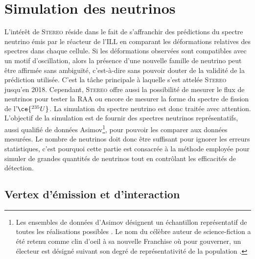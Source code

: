 
\section{Simulation des neutrinos}
\label{sec:neutrino_simulation}

L'intérêt de \textsc{Stereo} réside dans le fait de s'affranchir des prédictions du spectre neutrino émis par le réacteur de l'ILL en comparant les déformations relatives des spectres dans chaque cellule. Si les déformations observées sont compatibles avec un motif d'oscillation, alors la présence d'une nouvelle famille de neutrino peut être affirmée sans ambiguïté, c'est-à-dire sans pouvoir douter de la validité de la prédiction utilisée. C'est la tâche principale à laquelle s'est attelée \textsc{Stereo} jusqu'en 2018. Cependant, \textsc{Stereo} offre aussi la possibilité de mesurer le flux de neutrinos pour tester la RAA ou encore de mesurer la forme du spectre de fission de l'$\ce{^{235}U}$. La simulation du spectre neutrino est donc traitée avec attention.\\

L'objectif de la simulation est de fournir des spectres neutrinos représentatifs, aussi qualifié de \og données Asimov\fg{}\footnote{Les \og ensembles de données d'Asimov \fg{} désignent un échantillon représentatif de toutes les réalisations possibles \cite{Cowan2011}. Le nom du célèbre auteur de science-fiction a été retenu comme clin d'oeil à sa nouvelle \og Franchise\fg{} où pour gouverner, un électeur est désigné suivant son degré de représentativité de la population \cite{asimov1955}.}, pour pouvoir les comparer aux données mesurées. Le nombre de neutrinos doit donc être suffisant pour ignorer les erreurs statistiques, c'est pourquoi cette partie est consacrée à la méthode employée pour simuler de grandes quantités de neutrinos tout en contrôlant les efficacités de détection.\\

\subsection{Vertex d'émission et d'interaction}
\label{seq:mc_nu_vertex_em_int}

